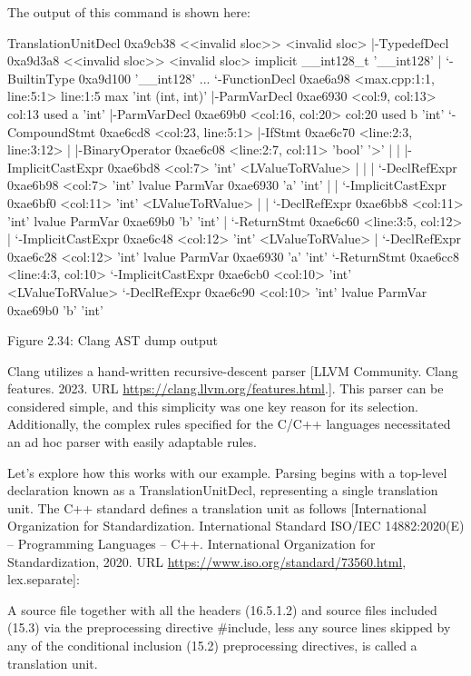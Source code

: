The output of this command is shown here:

\begin{shell}
TranslationUnitDecl 0xa9cb38 <<invalid sloc>> <invalid sloc>
|-TypedefDecl 0xa9d3a8 <<invalid sloc>> <invalid sloc>
implicit __int128_t '__int128'
| ‘-BuiltinType 0xa9d100 '__int128'
...
‘-FunctionDecl 0xae6a98 <max.cpp:1:1, line:5:1> line:1:5 max
'int (int, int)'
  |-ParmVarDecl 0xae6930 <col:9, col:13> col:13 used a 'int'
  |-ParmVarDecl 0xae69b0 <col:16, col:20> col:20 used b 'int'
  ‘-CompoundStmt 0xae6cd8 <col:23, line:5:1>
    |-IfStmt 0xae6c70 <line:2:3, line:3:12>
    | |-BinaryOperator 0xae6c08 <line:2:7, col:11> 'bool' '>'
    | | |-ImplicitCastExpr 0xae6bd8 <col:7> 'int' <LValueToRValue>
    | | | ‘-DeclRefExpr 0xae6b98 <col:7> 'int' lvalue ParmVar 0xae6930
            'a' 'int'
    | | ‘-ImplicitCastExpr 0xae6bf0 <col:11> 'int' <LValueToRValue>
    | |   ‘-DeclRefExpr 0xae6bb8 <col:11> 'int' lvalue ParmVar 0xae69b0
            'b' 'int'
    | ‘-ReturnStmt 0xae6c60 <line:3:5, col:12>
    |   ‘-ImplicitCastExpr 0xae6c48 <col:12> 'int' <LValueToRValue>
    |     ‘-DeclRefExpr 0xae6c28 <col:12> 'int' lvalue ParmVar 0xae6930
            'a' 'int'
    ‘-ReturnStmt 0xae6cc8 <line:4:3, col:10>
      ‘-ImplicitCastExpr 0xae6cb0 <col:10> 'int' <LValueToRValue>
        ‘-DeclRefExpr 0xae6c90 <col:10> 'int' lvalue ParmVar 0xae69b0
            'b' 'int'
\end{shell}

\begin{center}
Figure 2.34: Clang AST dump output
\end{center}

Clang utilizes a hand-written recursive-descent parser [LLVM Community. Clang features. 2023. URL \url{https://clang.llvm.org/features.html}.]. This parser can be considered simple, and this simplicity was one key reason for its selection. Additionally, the complex rules specified for the C/C++ languages necessitated an ad hoc parser with easily adaptable rules.

Let's explore how this works with our example. Parsing begins with a top-level declaration known as a TranslationUnitDecl, representing a single translation unit. The C++ standard defines a translation unit as follows [International Organization for Standardization. International Standard ISO/IEC 14882:2020(E) – Programming Languages – C++. International Organization for Standardization, 2020. URL \url{https://www.iso.org/standard/73560.html}, lex.separate]:

A source file together with all the headers (16.5.1.2) and source files included (15.3) via the preprocessing directive \#include, less any source lines skipped by any of the conditional inclusion (15.2) preprocessing directives, is called a translation unit.

